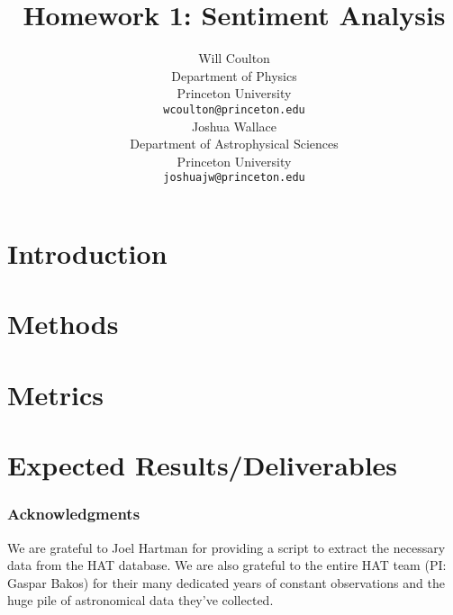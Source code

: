 \documentclass{article} %
\title{Homework 1: Sentiment Analysis}
\author{
Will Coulton \\
Department of Physics \\
Princeton University\\
\texttt{wcoulton@princeton.edu} \\
\And
Joshua Wallace\\
Department of Astrophysical Sciences\\
Princeton University\\
\texttt{joshuajw@princeton.edu} \\
}
\begin{document}
\maketitle

\begin{abstract}

\end{abstract}

\section{Introduction}





\section{Methods}


\section{Metrics}


\section{Expected Results/Deliverables}


\subsubsection*{Acknowledgments}
We are grateful to Joel Hartman for providing a script to extract the
necessary data from the HAT database.  We are also grateful to the
entire HAT team (PI: Gaspar Bakos) for their many dedicated years of
constant observations and the huge pile of astronomical data they've collected.




\end{document}
